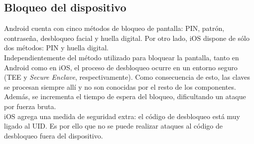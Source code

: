 \subsection{Bloqueo del dispositivo}
Android cuenta con cinco métodos de bloqueo de pantalla: PIN, patrón, contraseña, desbloqueo facial y huella digital. Por otro lado, iOS dispone de sólo dos métodos: PIN y huella digital.\\
Independientemente del método utilizado para bloquear la pantalla, tanto en Android como en iOS, el proceso de desbloqueo ocurre en un entorno seguro (TEE y \emph{Secure Enclave}, respectivamente). Como consecuencia de esto, las claves se procesan siempre allí y no son conocidas por el resto de los componentes. Además, se incrementa el tiempo de espera del bloqueo, dificultando un ataque por fuerza bruta.\\
iOS agrega una medida de seguridad extra: el código de desbloqueo está muy ligado al UID. Es por ello que no se puede realizar ataques al código de desbloqueo fuera del dispositivo.
